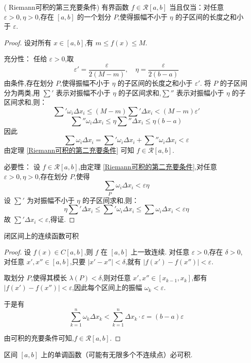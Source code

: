 \begin{theorem}( Riemann可积的第三充要条件)\label{Riemann可积的第三充要条件}
	有界函数 $f \in \mathcal{R}[a,b]$ 当且仅当：对任意 $\varepsilon>0, \eta>0$,存在 $[a,b]$ 的一个划分 $P$,使得振幅不小于 $\eta$ 的子区间的长度之和小于 $\varepsilon$.
\end{theorem}
\begin{proof}
	设对所有 $x \in [a,b]$,有 $m \leq f(x) \leq M$.
	
	充分性：
	任给 $\varepsilon>0$,取
	\[
	\varepsilon' = \frac{\varepsilon}{2(M-m)}, \quad \eta = \frac{\varepsilon}{2(b-a)}
	\]
	由条件,存在划分 $P$,使得振幅不小于 $\eta$ 的子区间的长度之和小于 $\varepsilon'$.
	将 $P$ 的子区间分为两类,用 $\sum\limits'$ 表示对振幅不小于 $\eta$ 的子区间求和,$\sum\limits''$ 表示对振幅小于 $\eta$ 的子区间求和,则：
	\[
	\sum' \omega_i \Delta x_i \leq (M-m) \sum' \Delta x_i < (M-m)\varepsilon'
	\]
	\[
	\sum'' \omega_i \Delta x_i \leq \eta \sum'' \Delta x_i \leq \eta (b-a)
	\]
	因此
	\[
	\sum \omega_i \Delta x_i = \sum' \omega_i \Delta x_i + \sum'' \omega_i \Delta x_i < \varepsilon
	\]
	由定理 \ref{Riemann可积的第二充要条件} 可知 $f \in \mathcal{R}[a,b]$.
	
	必要性：
	设 $f \in \mathcal{R}[a,b]$,由定理 \ref{Riemann可积的第二充要条件},对任意 $\varepsilon>0, \eta>0$,存在划分 $P$,使得
	\[
	\sum_{P} \omega_i \Delta x_i < \varepsilon \eta
	\]
	设 $\sum'$ 为对振幅不小于 $\eta$ 的子区间求和,则：
	\[
	\eta \sum' \Delta x_i \leq \sum' \omega_i \Delta x_i \leq \sum \omega_i \Delta x_i < \varepsilon \eta
	\]
	故 $\sum' \Delta x_i < \varepsilon$,得证.
\end{proof}
\begin{proposition}
	闭区间上的连续函数可积
\end{proposition}
\begin{proof}
	设 \( f(x) \in C[a,b] \),则 \( f \) 在 \( [a,b] \) 上一致连续.
	对任意 \( \varepsilon>0 \),存在 \( \delta>0 \),对任意 \( x',x'' \in [a,b] \),只要 \( |x'-x''| < \delta \),就有 \( |f(x')-f(x'')| < \varepsilon \).
	
	取划分 \( P \),使得其模长 \( \lambda(P) < \delta \),则对任意 \( x',x'' \in [x_{k-1},x_k] \),都有 \( |f(x')-f(x'')| < \varepsilon \),因此每个区间上的振幅 \( \omega_k < \varepsilon \).
	
	于是有
	\[
	\sum_{k=1}^n \omega_k \Delta x_k < \sum_{k=1}^n \Delta x_k \cdot \varepsilon = (b-a)\varepsilon
	\]
	
	由可积的充要条件可知,\( f \in \mathcal{R}[a,b] \).
\end{proof}
\begin{proposition}\label{单调函数（可能有无限多个不连续点）必可积}
	区间 $[a,b]$ 上的单调函数（可能有无限多个不连续点）必可积.
\end{proposition}
